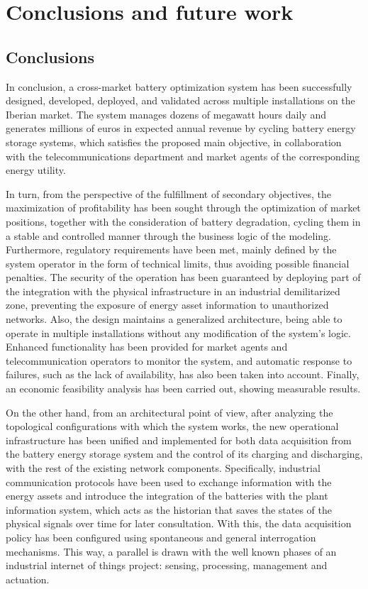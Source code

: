 \cleardoublepage%

\chapter*{Conclusions and future work}%
\label{makereference10}

\section*{Conclusions}

In conclusion, a cross-market battery optimization system has been successfully designed, developed, deployed, and validated across multiple installations on the Iberian market. The system manages dozens of megawatt hours daily and generates millions of euros in expected annual revenue by cycling battery energy storage systems, which satisfies the proposed main objective, in collaboration with the telecommunications department and market agents of the corresponding energy utility.

In turn, from the perspective of the fulfillment of secondary objectives, the maximization of profitability has been sought through the optimization of market positions, together with the consideration of battery degradation, cycling them in a stable and controlled manner through the business logic of the modeling. Furthermore, regulatory requirements have been met, mainly defined by the system operator in the form of technical limits, thus avoiding possible financial penalties. The security of the operation has been guaranteed by deploying part of the integration with the physical infrastructure in an industrial demilitarized zone, preventing the exposure of energy asset information to unauthorized networks. Also, the design maintains a generalized architecture, being able to operate in multiple installations without any modification of the system's logic. Enhanced functionality has been provided for market agents and telecommunication operators to monitor the system, and automatic response to failures, such as the lack of availability, has also been taken into account. Finally, an economic feasibility analysis has been carried out, showing measurable results.

On the other hand, from an architectural point of view, after analyzing the topological configurations with which the system works, the new operational infrastructure has been unified and implemented for both data acquisition from the battery energy storage system and the control of its charging and discharging, with the rest of the existing network components. Specifically, industrial communication protocols have been used to exchange information with the energy assets and introduce the integration of the batteries with the plant information system, which acts as the historian that saves the states of the physical signals over time for later consultation. With this, the data acquisition policy has been configured using spontaneous and general interrogation mechanisms. This way, a parallel is drawn with the well known phases of an industrial internet of things project: sensing, processing, management and actuation.

